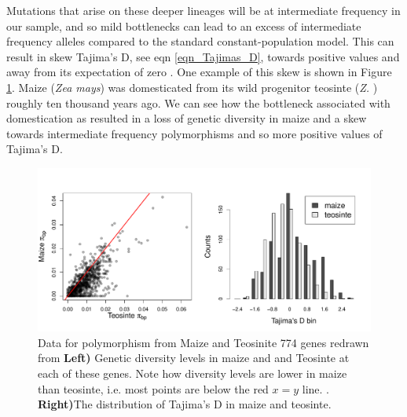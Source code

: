 Mutations that arise on these deeper lineages will be at intermediate frequency in our sample, and so mild bottlenecks
can lead to an excess of intermediate frequency alleles compared to
the standard constant-population model. This can result in skew 
Tajima's D, see eqn \ref{eqn_Tajimas_D}, towards positive values and away from its expectation of
zero . One example of this skew is shown in Figure
\ref{fig:maize_Tajimas_D}. Maize ({\it Zea mays}) was domesticated
  from its wild progenitor teosinte ({\it Z. }) roughly ten thousand years ago. We can see how the
 bottleneck associated with domestication as resulted in a loss of
 genetic diversity in maize and a skew
 towards intermediate frequency polymorphisms and so more positive
 values of Tajima's D.


\begin{figure}
\begin{center}
  \includegraphics[width = 0.75 \textwidth]{Journal_figs/genetic_drift/Maize_bottleneck/Wright_Tajima_D.pdf}
\end{center}
\caption{Data for polymorphism from Maize and Teosinite 774
  genes redrawn from \citeauthor{Wright:05}{\bf Left)} Genetic
  diversity levels in maize and and Teosinte at each of these genes.
Note how diversity levels are lower in maize than teosinte, i.e. most
points are below the red $x=y$ line.  
. {\bf Right)}The distribution of Tajima's D in maize and teosinte. } \label{fig:maize_Tajimas_D}  %
\end{figure}

